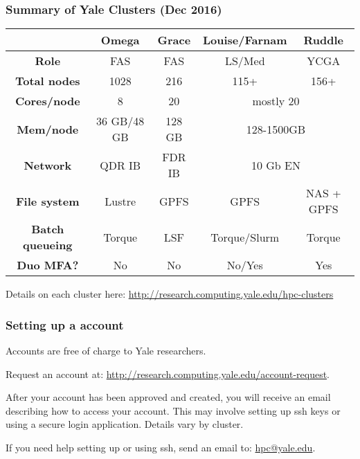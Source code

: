 \documentclass[10pt]{beamer}
\begin{document}
\begin{frame}[fragile]
\frametitle{Summary of Yale Clusters (Dec 2016)}
\begin{tabular}{|c|c|c|c|c|}
\hline
& \textbf{Omega} & \textbf{Grace}& \textbf{Louise/Farnam} & \textbf{Ruddle} \\
\hline
\textbf{Role} & FAS & FAS & LS/Med & YCGA  \\
\hline
\textbf{Total nodes} & 1028 & 216 & 115+ & 156+  \\
\hline
\textbf{Cores/node} & 8 & 20 & \multicolumn{2}{c}{mostly 20} \\
\hline
\textbf{Mem/node} & 36 GB/48 GB & 128 GB & \multicolumn{2}{c}{128-1500GB}  \\
\hline
\textbf{Network} & QDR IB & FDR IB& \multicolumn{2}{c}{10 Gb EN}  \\
\hline
\textbf{File system} & Lustre & GPFS & GPFS & NAS + GPFS \\
\hline
\textbf{Batch queueing} & Torque & LSF & Torque/Slurm & Torque \\
\hline
\textbf{Duo MFA?} & No & No & No/Yes & Yes \\
\hline
\end{tabular}

\vskip10pt

Details on each cluster here:
\url{http://research.computing.yale.edu/hpc-clusters}

\end{frame}

\begin{frame}[fragile]
\frametitle{Setting up a account}

Accounts are free of charge to Yale researchers.
\vskip10pt

Request an account at: \url{http://research.computing.yale.edu/account-request}.

\vskip10pt
After your account has been approved and created, you will receive
an email describing how to access your account.  This may involve setting up ssh keys or 
using a secure login application.  Details vary by cluster.

\vskip10pt
If you need help setting up or using ssh, send an email to: \url{hpc@yale.edu}.
\end{frame}
\end{document}
